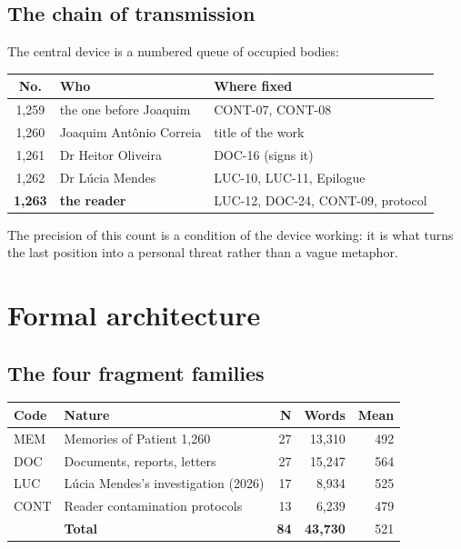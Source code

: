 \documentclass[11pt,a4paper]{article}
\begin{document}
\subsection{The chain of transmission}

The central device is a numbered queue of occupied bodies:

\begin{center}\small
\begin{tabular}{@{}cll@{}}
\toprule
\textbf{No.} & \textbf{Who} & \textbf{Where fixed} \\
\midrule
1,259 & the one before Joaquim & CONT-07, CONT-08 \\
1,260 & Joaquim Antônio Correia & title of the work \\
1,261 & Dr Heitor Oliveira & DOC-16 (signs it) \\
1,262 & Dr Lúcia Mendes & LUC-10, LUC-11, Epilogue \\
\textbf{1,263} & \textbf{the reader} & LUC-12, DOC-24, CONT-09, protocol \\
\bottomrule
\end{tabular}
\end{center}

The precision of this count is a condition of the device working: it is what
turns the last position into a personal threat rather than a vague metaphor.

\section{Formal architecture}

\subsection{The four fragment families}

\begin{center}\small
\begin{tabular}{@{}llrrr@{}}
\toprule
\textbf{Code} & \textbf{Nature} & \textbf{N} & \textbf{Words} & \textbf{Mean} \\
\midrule
MEM  & Memories of Patient 1,260 & 27 & 13,310 & 492 \\
DOC  & Documents, reports, letters & 27 & 15,247 & 564 \\
LUC  & Lúcia Mendes's investigation (2026) & 17 & 8,934 & 525 \\
CONT & Reader contamination protocols & 13 & 6,239 & 479 \\
\midrule
     & \textbf{Total} & \textbf{84} & \textbf{43,730} & 521 \\
\bottomrule
\end{tabular}
\end{center}
\end{document}
